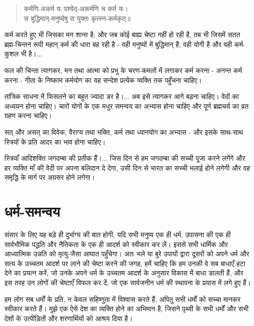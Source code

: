 \begin{verse}
कर्मणि-अकर्म यः पश्येद्-अकर्मणि च कर्म यः।\\स बुद्धिमान्-मनुष्येषु स युक्तः कृत्स्न-कर्मकृत्॥ 
\end{verse}

कर्म करते हुए भी जिसका मन शान्त है; और जब कोई बाह्य चेष्टा नहीं हो रही है, तब भी जिसमें सतत ब्रह्म-चिन्तन रूपी महान् कर्म की धारा बह रही है - वही मनुष्यों में बुद्धिमान् है, वही योगी है और वही कर्म-कुशल भी है।... 

फल की चिन्ता त्यागकर, मन तथा आत्मा को प्रभु के चरण-कमलों में लगाकर कर्म करना - अनन्त कर्म करना - गीता के निष्काम कर्मयोग का यह सन्देश प्रत्येक व्यक्ति तक पहुँचना चाहिए। 

तांत्रिक साधना में फिसलने का बहुत ज्यादा डर है।... अब इसे त्यागकर आगे बढ़ना चाहिए। वेदों का अध्ययन होना चाहिए। चारों योगों के एक मधुर समन्वय का अभ्यास होना चाहिए और पूर्ण ब्रह्मचर्य का व्रत ग्रहण करना चाहिए। 

सत् और असत् का विवेक, वैराग्य तथा भक्ति, कर्म तथा ध्यानयोग का अभ्यास - और इसके साथ-साथ स्त्रियों के प्रति आदर का भाव होना चाहिए। 

स्त्रियाँ आदिशक्ति जगदम्बा की प्रतीक हैं।... जिस दिन से हम जगदम्बा की सच्ची पूजा करने लगेंगे और हर व्यक्ति माँ की वेदी पर अपना बलिदान दे देगा, उसी दिन से भारत का सच्ची भलाई होने लगेगी और वह समृद्धि के मार्ग पर अग्रसर होने लगेगा।


\section*{धर्म-समन्वय}


संसार के लिए यह बड़े ही दुर्भाग्य की बात होगी, यदि सभी मनुष्य एक ही धर्म, उपासना की एक ही सार्वभौमिक पद्धति और नैतिकता के एक ही आदर्श को स्वीकार कर लें। इससे सभी धार्मिक और आध्यात्मिक उन्नति को मृत्यु-जैसा आघात पहुँचेगा। अतः भले या बुरे उपायों द्वारा दूसरों को अपने धर्म और सत्य के उच्चतम आदर्श पर लाने की चेष्टा करने की जगह, हमें चाहिए कि हम उनकी वे सब बाधाएँ हटा देने का प्रयत्न करें, जो उनके अपने धर्म के उच्चतम आदर्श के अनुसार विकास में बाधा डालती हैं, और इस तरह उन लोगों की चेष्टाएँ विफल कर दें, जो एक सार्वजनीन धर्म की स्थापना के प्रयास में लगे हुए हैं। 

हम लोग सब धर्मों के प्रति, न केवल सहिष्णुता में विश्वास करते हैं, अपितु सभी धर्मों को सच्चा मानकर स्वीकार करते हैं। मुझे एक ऐसे देश का व्यक्ति होने का अभिमान है, जिसने पृथ्वी के सभी धर्मों और सभी देशों के उत्पीड़ितों और शरणार्थियों को आश्रय दिया है। 

